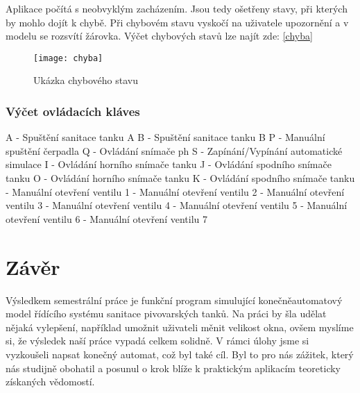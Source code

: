 \documentclass[12pt, a4paper]{article}
\begin{document}
Aplikace počítá s neobvyklým zacházením. Jsou tedy ošetřeny stavy, při kterých by mohlo dojít k chybě. Při chybovém stavu vyskočí na uživatele upozornění a v modelu se rozsvítí žárovka. Výčet chybových stavů lze najít zde: \ref{chyba}

\begin{figure}[h!]
\centering 
\texttt{[image: chyba]}
\caption{Ukázka chybového stavu}
\end{figure}

\subsubsection{Výčet ovládacích kláves} \label{ovladani}
A - Spuštění sanitace tanku A \newline 
B - Spuštění sanitace tanku B \newline 
P - Manuální spuštění čerpadla \newline
Q - Ovládání snímače ph \newline
S - Zapínání/Vypínání automatické simulace \newline
I - Ovládání horního snímače tanku \newline
J - Ovládání spodního snímače tanku \newline
O - Ovládání horního snímače tanku \newline
K - Ovládání spodního snímače tanku  - Manuální otevření ventilu 1  - Manuální otevření ventilu 2  - Manuální otevření ventilu 3  - Manuální otevření ventilu 4  - Manuální otevření ventilu 5  - Manuální otevření ventilu 6  - Manuální otevření ventilu 7 \newline  

\newpage
\section{Závěr}
Výsledkem semestrální práce je funkční program simulující konečněautomatový model řídícího systému sanitace pivovarských tanků. Na práci by šla udělat nějaká vylepšení, například umožnit uživateli měnit velikost okna, ovšem myslíme si, že výsledek naší práce vypadá celkem solidně. V rámci úlohy jsme si vyzkoušeli napsat konečný automat, což byl také cíl. Byl to pro nás zážitek, který nás studijně obohatil a posunul o krok blíže k praktickým aplikacím teoreticky získaných vědomostí. 

\nocite{wiki:Konecny_automat}

\listoffigures



\end{document}

